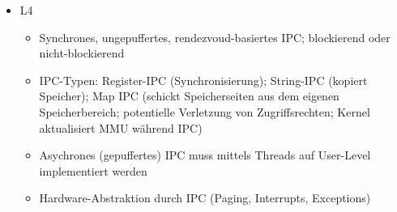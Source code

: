 \begin{itemize}
\begin{itemize}
\begin{itemize}
		\end{itemize}
		\item L4
		\begin{itemize}
			\item Synchrones, ungepuffertes, rendezvoud-basiertes IPC; blockierend oder nicht-blockierend
			\item IPC-Typen: Register-IPC (Synchronisierung); String-IPC (kopiert Speicher); Map IPC (schickt Speicherseiten aus dem eigenen Speicherbereich; potentielle Verletzung von Zugriffsrechten; Kernel aktualisiert MMU während IPC)
			\item Asychrones (gepuffertes) IPC muss mittels Threads auf User-Level implementiert werden
			\item Hardware-Abstraktion durch IPC (Paging, Interrupts, Exceptions)
		\end{itemize}
	\end{itemize}
\end{itemize}


